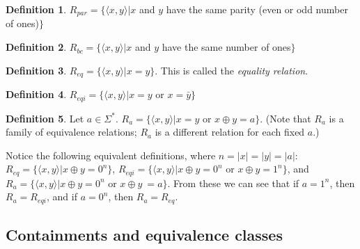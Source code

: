 \documentclass{article}
\theoremstyle{definition} \newtheorem{definition}[definition]{Definition}
\newcommand{\sigmastar}{\Sigma^{*}} %
\newcommand{\defn}[1]{\emph{#1}} %
\newcommand{\pair}[2]{\langle#1,#2\rangle} %
\begin{document}
\begin{definition}
  $R_{par}=\{\pair{x}{y}|x$ and $y$ have the same parity (even or odd number of
  ones)$\}$
\end{definition}
\begin{definition}
  $R_{bc}=\{\pair{x}{y}|x$ and $y$ have the same number of ones$\}$
\end{definition}
\begin{definition}
  $R_{eq}=\{\pair{x}{y}|x=y\}$. This is called the \defn{equality relation}.
\end{definition}
\begin{definition}
  $R_{eqi}=\{\pair{x}{y}|x=y$ or $x=\bar{y}\}$
\end{definition}
\begin{definition}
  Let $a\in\sigmastar$. $R_{a}=\{\pair{x}{y}|x=y$ or $x\oplus y=a\}$. (Note
  that $R_{a}$ is a family of equivalence relations; $R_{a}$ is a different
  relation for each fixed $a$.)
\end{definition}

Notice the following equivalent definitions, where $n=|x|=|y|=|a|$:
$R_{eq}=\{\pair{x}{y}|x \oplus y = 0^n\}$, $R_{eqi}=\{\pair{x}{y}|x \oplus y =
0^n$ or $x\oplus y = 1^n\}$, and $R_a=\{\pair{x}{y}|x \oplus y = 0^n$ or $x
\oplus y\ = a\}$. From these we can see that if $a=1^n$, then $R_a=R_{eqi}$,
and if $a=0^n$, then $R_a=R_{eq}$.

\subsection{Containments and equivalence classes}
\end{document}
